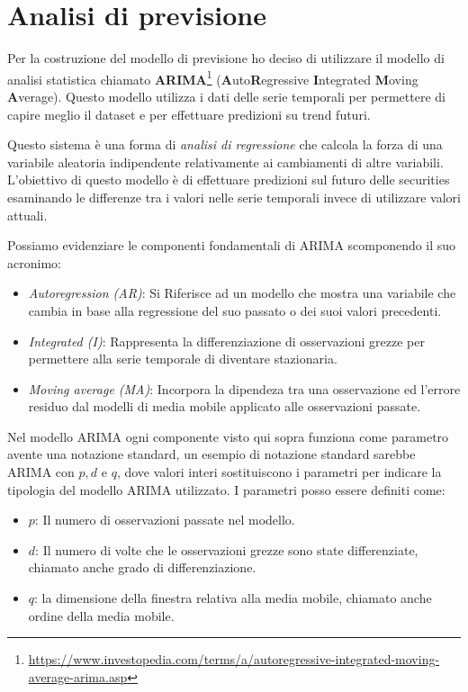 
\section{Analisi di previsione}

Per la costruzione del modello di previsione ho deciso di utilizzare il modello di analisi statistica chiamato
\textbf{ARIMA}\footnote{
    \href{https://www.investopedia.com/terms/a/autoregressive-integrated-moving-average-arima.asp}{https://www.investopedia.com/terms/a/autoregressive-integrated-moving-average-arima.asp}
} (\textbf{A}uto\textbf{R}egressive \textbf{I}ntegrated \textbf{M}oving \textbf{A}verage).
Questo modello utilizza i dati delle serie temporali per permettere di capire meglio il dataset e per effettuare predizioni su trend futuri.

Questo sistema è una forma di \emph{analisi di regressione} che calcola la forza di una variabile aleatoria indipendente relativamente ai cambiamenti di altre variabili.
L'obiettivo di questo modello è di effettuare predizioni sul futuro delle securities esaminando le differenze tra i valori nelle serie temporali invece di utilizzare valori attuali.  

Possiamo evidenziare le componenti fondamentali di ARIMA scomponendo il suo acronimo:
\begin{itemize}
    \item \emph{Autoregression (AR)}: Si Riferisce ad un modello che mostra una variabile che cambia in base alla regressione
    del suo passato o dei suoi valori precedenti.
    \item \emph{Integrated (I)}: Rappresenta la differenziazione di osservazioni grezze per permettere alla serie temporale di diventare
    stazionaria.
    \item \emph{Moving average (MA)}: Incorpora la dipendeza tra una osservazione ed l'errore residuo dal modelli di media 
    mobile applicato alle osservazioni passate.
\end{itemize}

Nel modello ARIMA ogni componente visto qui sopra funziona come parametro avente una notazione standard, 
un esempio di notazione standard sarebbe ARIMA con \(p, d\) e \(q\), dove valori interi sostituiscono i parametri
per indicare la tipologia del modello ARIMA utilizzato. I parametri posso essere definiti come:

\begin{itemize}
    \item \(p\): Il numero di osservazioni passate nel modello.
    \item \(d\): Il numero di volte che le osservazioni grezze sono state differenziate, chiamato anche grado di differenziazione.
    \item \(q\): la dimensione della finestra relativa alla media mobile, chiamato anche ordine della media mobile.
\end{itemize}